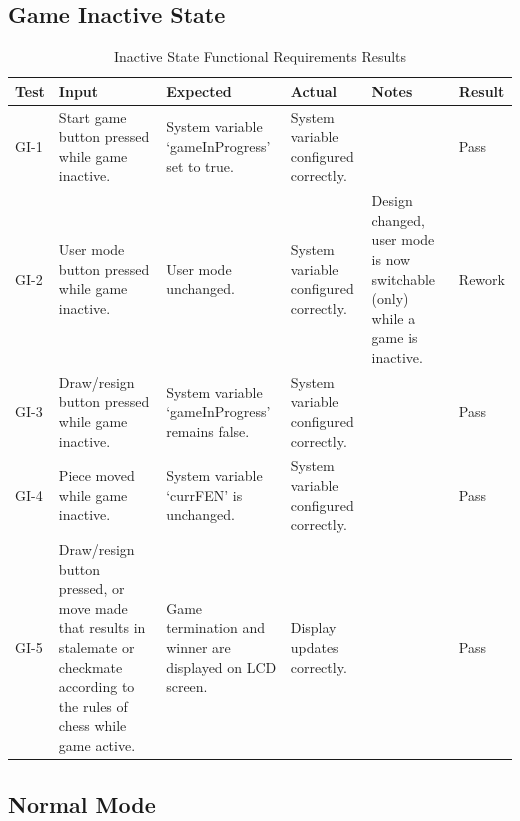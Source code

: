 \documentclass[12pt, titlepage]{article}
\begin{document}
\subsection{Game Inactive State}

\begin{table}[H]
    \centering
        \setlength{\leftmargini}{0cm}
        \begin{tabular}{| >{\centering\arraybackslash}m{1cm} | 
            >{\centering\arraybackslash}m{2.5cm} | 
            >{\centering\arraybackslash}m{4cm} | 
            >{\centering\arraybackslash}m{3cm} |
            >{\centering\arraybackslash}m{3cm} |
            >{\centering\arraybackslash}m{1.5cm} |}
        \hline
        \rowcolor[gray]{0.9}
        Test & Input & Expected & Actual & Notes & Result\\
        \hline
        GI-1 & Start game button pressed while game inactive. & System variable `gameInProgress' set to true. & System variable configured correctly. &  & Pass \\
        \hline
        GI-2 & User mode button pressed while game inactive. & User mode unchanged. & System variable configured correctly. & Design changed, user mode is now switchable (only) while a game is inactive. & Rework \\
        \hline
        GI-3 & Draw/resign button pressed while game inactive. & System variable `gameInProgress' remains false. & System variable configured correctly. &  & Pass \\
        \hline
        GI-4 & Piece moved while game inactive. & System variable `currFEN' is unchanged. & System variable configured correctly. &  & Pass \\
        \hline
        GI-5 & Draw/resign button pressed, or move made that results in stalemate or checkmate according to the rules of chess while game active. & Game termination and winner are displayed on LCD screen. & Display updates correctly. &  & Pass \\
        \hline
        \end{tabular}
    \caption{Inactive State Functional Requirements Results}
\end{table}

\subsection{Normal Mode}
\end{document}
